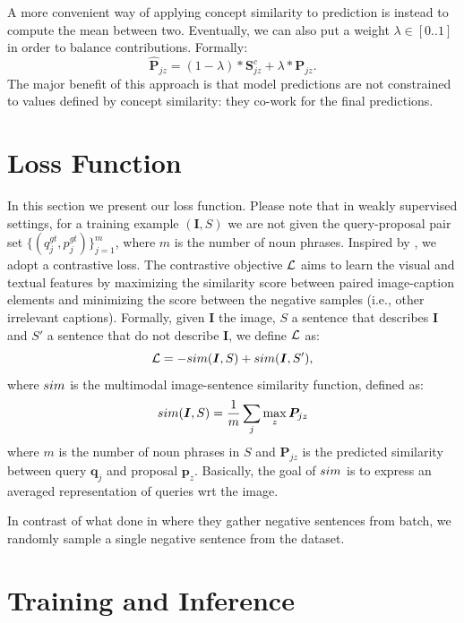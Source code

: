 A more convenient way of applying concept similarity to prediction is
instead to compute the mean between two. Eventually, we can also put a
weight $\lambda \in [0 .. 1]$ in order to balance
contributions. Formally:
\begin{equation}
  \bm{\hat{P}}_{jz} = (1 - \lambda) * \bm{S}^c_{jz} + \lambda * \bm{P}_{jz}.
\end{equation}
The major benefit of this approach is that model predictions are not
constrained to values defined by concept similarity: they co-work for
the final predictions.

\section{Loss Function}
\label{sec:loss}

In this section we present our loss function. Please note that in
weakly supervised settings, for a training example $\left( \bm{I}, S
\right)$ we are not given the query-proposal pair set $\{ ( q^{gt}_j,
p^{gt}_j ) \}^m_{j=1}$, where $m$ is the number of noun phrases.
Inspired by \cite{wang2020maf}, we adopt a contrastive loss. The
contrastive objective $\mathcal{L}$ aims to learn the visual and textual
features by maximizing the similarity score between paired
image-caption elements and minimizing the score between the negative
samples (i.e., other irrelevant captions). Formally, given $\bm{I}$
the image, $S$ a sentence that describes $\bm{I}$ and $S'$ a sentence
that do not describe $\bm{I}$, we define $\mathcal{L}$ as:
\begin{equation}
  \mathcal{L} =  - sim(\bm{I}, S) + sim(\bm{I}, S'),
\end{equation}
where
$sim$ is the multimodal image-sentence similarity function, defined as:
\begin{equation}
  sim(\bm{I}, S) = \frac{1}{m} \sum_j \max_z \bm{P}_{jz}
\end{equation}
where $m$ is the number of noun phrases in $S$ and $\bm{P}_{jz}$ is
the predicted similarity between query $\bm{q}_j$ and proposal
$\bm{p}_z$. Basically, the goal of $sim$ is to express an averaged
representation of queries wrt the image.

In contrast of what done in \cite{wang2020maf} where they gather
negative sentences from batch, we randomly sample a single negative
sentence from the dataset.

\section{Training and Inference}
\label{sec:training-and-inference}

